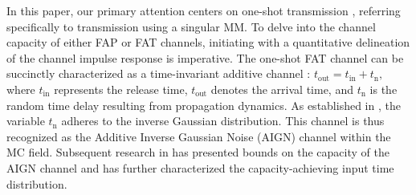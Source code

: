 \documentclass[conference]{IEEEtran}
\theoremstyle{definition}
\theoremstyle{plain}
\begin{document}
\color{black}
In this paper, our primary attention centers on one-shot transmission \cite{murin2018optimal}, referring specifically to transmission using a singular MM. To delve into the channel capacity of either FAP or FAT channels, initiating with a quantitative delineation of the channel impulse response is imperative. The one-shot FAT channel can be succinctly characterized as a time-invariant additive channel \cite{srinivas2012molecular}:
$
    t_{\text{out}} = t_{\text{in}} + t_{\text{n}},
$
where $t_{\text{in}}$ represents the release time, $t_{\text{out}}$ denotes the arrival time, and $t_{\text{n}}$ is the random time delay resulting from propagation dynamics. As established in \cite{srinivas2012molecular}, the variable $t_{\text{n}}$ adheres to the inverse Gaussian distribution. This channel is thus recognized as the Additive Inverse Gaussian Noise (AIGN) channel within the MC field. Subsequent research in \cite{srinivas2012molecular,li2014capacity} has presented bounds on the capacity of the AIGN channel and has further characterized the capacity-achieving input time distribution.
\color{black}

\end{document}

